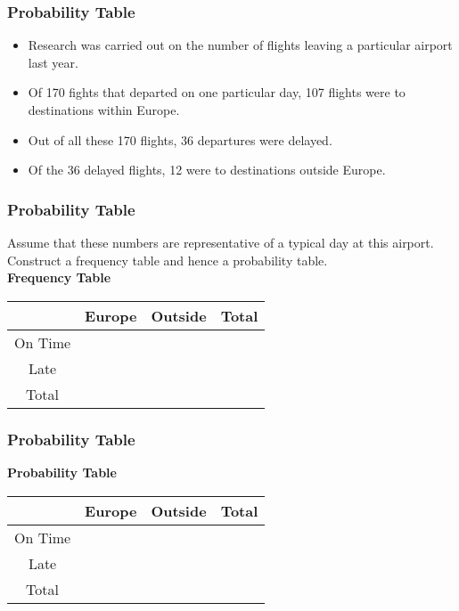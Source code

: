 \documentclass[IntroMain.tex]{subfiles}
\begin{document}
\begin{frame}
\frametitle{Probability Table}
\LARGE
\begin{itemize}
\item Research was carried out on the number of flights leaving a particular airport last year. 

\item Of 170 fights that departed on one particular day, 107 flights were to destinations within Europe. 
\item Out of all these 170 flights, 36 departures were delayed. 

\item Of the 36 delayed flights, 12 were to destinations outside Europe. 


\end{itemize}
\end{frame}
\begin{frame}
\frametitle{Probability Table}
\Large
Assume that these numbers are representative of a typical 
day at this airport. Construct a frequency table and hence a probability table.\\ \bigskip
\textbf{Frequency Table}\\ \bigskip
\begin{tabular}{|c|c|c||c|}
\hline  &  \phantom{sp} Europe \phantom{sp} & \phantom{sp} Outside \phantom{sp} &\phantom{sp} Total\phantom{sp}  \\ 
\hline On Time  &  &  &  \\ 
\hline Late &  &  &  \\ \hline
\hline Total  &  &  &  \\ 
\hline 
\end{tabular} 
\end{frame}



\begin{frame}
\frametitle{Probability Table}
\Large
\textbf{Probability Table} \\ \bigskip
\begin{tabular}{|c|c|c||c|}
\hline  &  \phantom{sp} Europe \phantom{sp} & \phantom{sp} Outside \phantom{sp} & \phantom{sp} Total\phantom{sp}  \\ 
\hline On Time  &  &  &  \\ 
\hline Late &  &  &  \\ \hline
\hline Total  &  &  &  \\ 
\hline 
\end{tabular} 
\end{frame}
\end{document}
